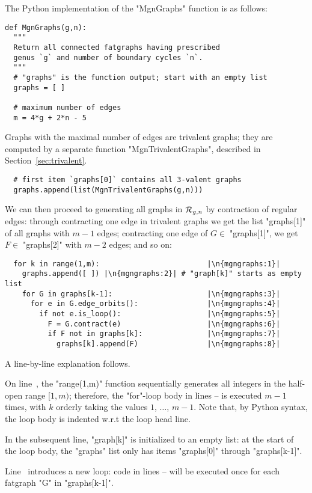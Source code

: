 The Python implementation of the "MgnGraphs" function is as follows:
\begin{lstlisting}
def MgnGraphs(g,n):
  """
  Return all connected fatgraphs having prescribed
  genus `g` and number of boundary cycles `n`.
  """
  # "graphs" is the function output; start with an empty list
  graphs = [ ]

  # maximum number of edges
  m = 4*g + 2*n - 5
\end{lstlisting}
Graphs with the maximal number of edges are trivalent graphs; they are
computed by a separate function "MgnTrivalentGraphs", described in
Section~\ref{sec:trivalent}.
\begin{lstlisting}
  # first item `graphs[0]` contains all 3-valent graphs
  graphs.append(list(MgnTrivalentGraphs(g,n)))
\end{lstlisting}
We can then proceed to generating all graphs in $\mathcal{R}_{g,n}$ by
contraction of regular edges: through contracting one edge in
trivalent graphs we get the list "graphs[1]" of all graphs with
$m-1$ edges; contracting one edge of $G \in \;$"graphs[1]", we
get $F \in \;$"graphs[2]" with $m-2$ edges; and so on:
\begin{lstlisting}
  for k in range(1,m):                         |\n{mgngraphs:1}|
    graphs.append([ ]) |\n{mgngraphs:2}| # "graph[k]" starts as empty list
    for G in graphs[k-1]:                      |\n{mgngraphs:3}|
      for e in G.edge_orbits():                |\n{mgngraphs:4}|
        if not e.is_loop():                    |\n{mgngraphs:5}|
          F = G.contract(e)                    |\n{mgngraphs:6}|
          if F not in graphs[k]:               |\n{mgngraphs:7}|
            graphs[k].append(F)                |\n{mgngraphs:8}|
\end{lstlisting}
A line-by-line explanation follows.

On line~, the "range(1,m)" function sequentially
generates all integers in the half-open range $[1, m)$; therefore, the
"for"-loop body in lines -- is
executed $m-1$ times, with $k$ orderly taking the values $1$, $\ldots$,
$m-1$.  Note that, by Python syntax, the loop body is indented w.r.t
the loop head line.

In the subsequent line, "graph[k]" is initialized to an empty list: at
the start of the loop body, the "graphs" list only has items
"graphs[0]" through "graphs[k-1]".

Line~ introduces a new loop: code in lines
-- will be executed once for each
fatgraph "G" in "graphs[k-1]".

